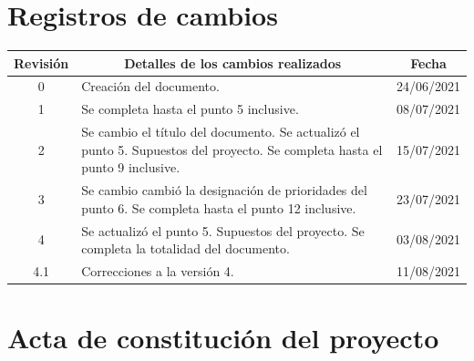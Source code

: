 \documentclass[
11pt, %
codirector, %
]{charter}
\begin{document}
\maketitle
\thispagestyle{empty}
\pagebreak


\thispagestyle{empty}
{\setlength{\parskip}{0pt}
\tableofcontents{}
}
\pagebreak


\section*{Registros de cambios}
\label{sec:registro}


\begin{table}[ht]
\label{tab:registro}
\centering
\begin{tabularx}{\linewidth}{@{}|c|X|c|@{}}
\hline
\rowcolor[HTML]{C0C0C0} 
Revisión & \multicolumn{1}{c|}{\cellcolor[HTML]{C0C0C0}Detalles de los cambios realizados} & Fecha      \\ \hline
0      & Creación del documento.                                 &24/06/2021\\ \hline
1      & Se completa hasta el punto 5 inclusive.                 & 08/07/2021 \\ \hline
2      & Se cambio el título del documento.\newline
		 Se actualizó el punto 5. Supuestos del proyecto.\newline  
		 Se completa hasta el punto 9 inclusive.      		      & 15/07/2021 \\ \hline
3     & Se cambio cambió la designación de prioridades del punto 6.\newline 
		 Se completa hasta el punto 12 inclusive.      		      & 23/07/2021 \\ \hline
4     & Se actualizó el punto 5. Supuestos del proyecto.\newline 
		 Se completa la totalidad del documento.      		      & 03/08/2021 \\ \hline
4.1     & Correcciones a la versión 4.        		      & 11/08/2021 \\ \hline
\end{tabularx}
\end{table}

\pagebreak



\section*{Acta de constitución del proyecto}
\label{sec:acta}
\end{document}
